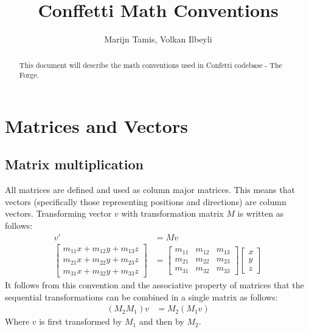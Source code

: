 \documentclass{article}
\renewcommand{\Vec}[1]{#1}
\newcommand{\Mat}[1]{#1}
\newcommand{\BuildMat}[1]{\left[\begin{matrix}#1\end{matrix}\right]}
\begin{document}
\title{Conffetti Math Conventions}
\author{Marijn Tamis, Volkan Ilbeyli}
\maketitle

\begin{abstract}
This document will describe the math conventions used in Confetti codebase - The Forge.
\end{abstract}

\section{Matrices and Vectors}
\subsection{Matrix multiplication}
All matrices are defined and used as column major matrices.
This means that vectors (specifically those representing positions and directions) are column vectors.
Transforming vector $\Vec{v}$ with transformation matrix $\Mat{M}$ is written as follows:
\begin{align*}
\Vec{v}' &= \Mat{M} \Vec{v}\\
\BuildMat{
m_{11}x+m_{12}y+m_{13}z\\
m_{21}x+m_{22}y+m_{23}z\\
m_{31}x+m_{32}y+m_{33}z
}
&=
\BuildMat{
m_{11}&m_{12}&m_{13}\\
m_{21}&m_{22}&m_{23}\\
m_{31}&m_{32}&m_{33}
}
\BuildMat{x\\y\\z}
\end{align*}
It follows from this convention and the associative property of matrices that the sequential transformations can be combined in a single matrix as follows:
\begin{align*}
\left(\Mat{M}_2\Mat{M}_1\right)\Vec{v} &= \Mat{M}_2\left(\Mat{M}_1\Vec{v}\right)
\end{align*}
Where $\Vec{v}$ is first transformed by $\Mat{M}_1$ and then by $\Mat{M}_2$.
\end{document}
